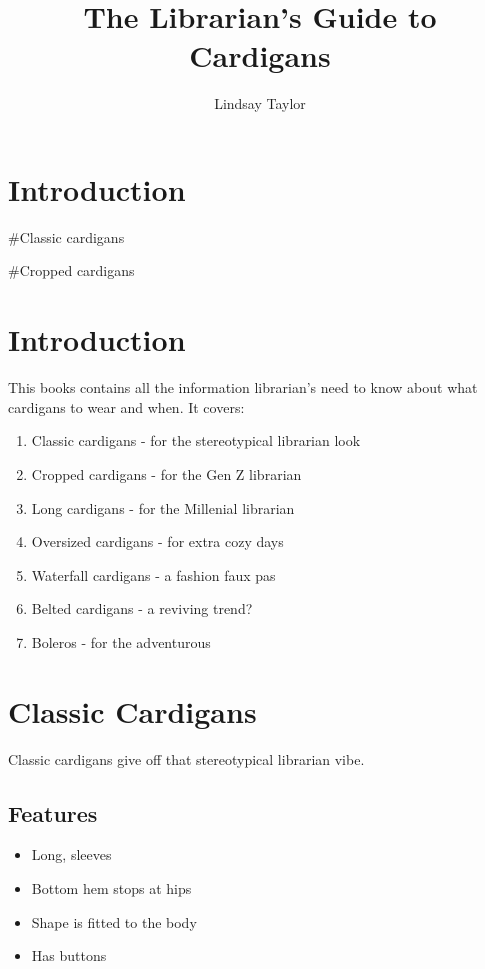 \documentclass[
  openany]{book}
\title{The Librarian's Guide to Cardigans}
\author{Lindsay Taylor}
\date{}
\providecommand{\tightlist}{%
  \setlength{\itemsep}{0pt}\setlength{\parskip}{0pt}}
\begin{document}
\maketitle

{
\setcounter{tocdepth}{1}
\tableofcontents
}
\hypertarget{introduction}{%
\chapter{Introduction}\label{introduction}}

\#Classic cardigans

\#Cropped cardigans

\hypertarget{introduction-1}{%
\chapter{Introduction}\label{introduction-1}}

This books contains all the information librarian's need to know about what cardigans to wear and when. It covers:

\begin{enumerate}
\def\labelenumi{\arabic{enumi}.}
\tightlist
\item
  Classic cardigans - for the stereotypical librarian look
\item
  Cropped cardigans - for the Gen Z librarian
\item
  Long cardigans - for the Millenial librarian
\item
  Oversized cardigans - for extra cozy days
\item
  Waterfall cardigans - a fashion faux pas
\item
  Belted cardigans - a reviving trend?
\item
  Boleros - for the adventurous
\end{enumerate}

\hypertarget{classic-cardigans}{%
\chapter{Classic Cardigans}\label{classic-cardigans}}

Classic cardigans give off that stereotypical librarian vibe.

\hypertarget{features}{%
\section{Features}\label{features}}

\begin{itemize}
\tightlist
\item
  Long, sleeves
\item
  Bottom hem stops at hips
\item
  Shape is fitted to the body
\item
  Has buttons
\end{itemize}
\end{document}

